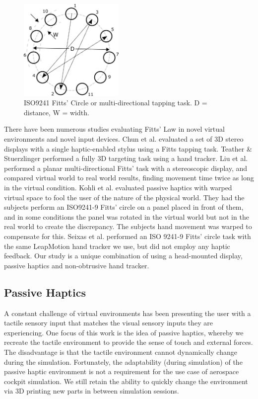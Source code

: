 \documentclass[]{aiaa-tc}%
\begin{document}
\begin{figure}[htb]
  \centering
  \includegraphics[width=0.45\textwidth]{figures/iso9241.png}
  \caption{ISO9241 Fitts' Circle or multi-directional tapping task. D = distance, W = width.}
  \label{fig:circle}
\end{figure}

There have been numerous studies evaluating Fitts' Law in novel virtual environments and novel input devices.
Chun et al.\cite{chun_evaluating_2004} evaluated a set of 3D stereo displays with a single haptic-enabled stylus using a Fitts tapping task.
Teather \& Stuerzlinger\cite{teather_pointing_2011} performed a fully 3D targeting task using a hand tracker.
Liu et al.\cite{liu_comparing_2009} performed a planar multi-directional Fitts' task with a stereoscopic display, and compared virtual world to real world results, finding movement time twice as long in the virtual condition.
Kohli et al.\cite{kohli_redirected_2012} evaluated passive haptics with warped virtual space to fool the user of the nature of the physical world.
They had the subjects perform an ISO9241-9 Fitts' circle on a panel placed in front of them, and in some conditions the panel was rotated in the virtual world but not in the real world to create the discrepancy.
The subjects hand movement was warped to compensate for this.
Seixas et al.\cite{seixas_one_2015} performed an ISO 9241-9 Fitts' circle task with the same LeapMotion hand tracker we use, but did not employ any haptic feedback.
Our study is a unique combination of using a head-mounted display, passive haptics and non-obtrusive hand tracker.

\subsection{Passive Haptics}
A constant challenge of virtual environments has been presenting the user with a tactile sensory input that matches the visual sensory inputs they are experiencing.
One focus of this work is the idea of passive haptics, whereby we recreate the tactile environment to provide the sense of touch and external forces.
The disadvantage is that the tactile environment cannot dynamically change during the simulation.
Fortunately, the adaptability (during simulation) of the passive haptic environment is not a requirement for the use case of aerospace cockpit simulation.
We still retain the ability to quickly change the environment via 3D printing new parts in between simulation sessions.
\end{document}
